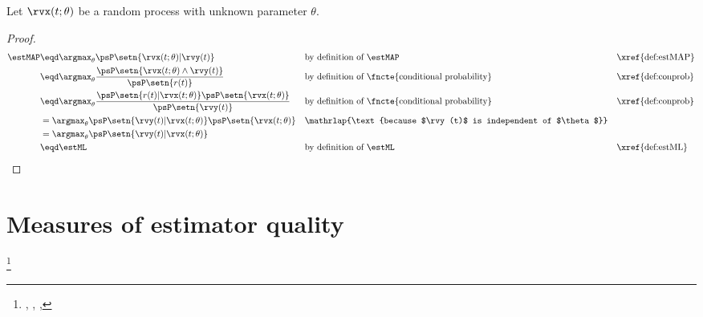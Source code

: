 \begin{theorem}
\label{thm:map=ml}
Let $\rvx(t;\theta)$ be a random process with unknown parameter $\theta$.
\end{theorem}
\begin{proof}
\begin{align*}
   \estMAP
     &\eqd \argmax_{\theta} \psP\setn{\rvx(t;\theta)|\rvy(t)}
     &&    \text{by definition of $\estMAP$}
     &&    \text{\xref{def:estMAP}}
   \\&\eqd \argmax_{\theta} \frac{\psP\setn{\rvx(t;\theta) \land \rvy(t)}}
                               {\psP\setn{r(t)}}
     && \text{by definition of \fncte{conditional probability}}
     && \text{\xref{def:conprob}}
   \\&\eqd \argmax_{\theta} \frac{\psP\setn{r(t) | \rvx(t;\theta) }\psP\setn{\rvx(t;\theta) }}
                               {\psP\setn{\rvy(t)}}
     && \text{by definition of \fncte{conditional probability}}
     && \text{\xref{def:conprob}}
   \\&=    \argmax_{\theta} \psP\setn{\rvy(t) | \rvx(t;\theta) }\psP\setn{\rvx(t;\theta)}
     &&\mathrlap{\text{because $\rvy(t)$ is independent of $\theta$}}
   \\&=    \argmax_{\theta} \psP\setn{\rvy(t) | \rvx(t;\theta) }
   \\&\eqd \estML
     &&  \text{by definition of $\estML$}
     &&  \text{\xref{def:estML}}
\end{align*}
\end{proof}

\section{Measures of estimator quality}
\label{sec:quality}
\begin{definition}
\footnote{
  ,
  ,
  ,
  }
\label{def:mse}
\end{definition}

